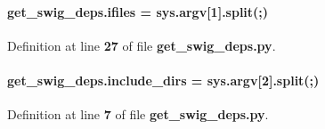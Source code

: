 \paragraph[{ifiles}]{\setlength{\rightskip}{0pt plus 5cm}get\+\_\+swig\+\_\+deps.\+ifiles = sys.\+argv[1].split(\textquotesingle{};\textquotesingle{})}\label{namespaceget__swig__deps_a8833b8795d7f15348851531446877ac9}


Definition at line {\bf 27} of file {\bf get\+\_\+swig\+\_\+deps.\+py}.

\paragraph[{include\+\_\+dirs}]{\setlength{\rightskip}{0pt plus 5cm}get\+\_\+swig\+\_\+deps.\+include\+\_\+dirs = sys.\+argv[2].split(\textquotesingle{};\textquotesingle{})}\label{namespaceget__swig__deps_a6d03bb7e9b8b12ce33853bb84248a82f}


Definition at line {\bf 7} of file {\bf get\+\_\+swig\+\_\+deps.\+py}.

